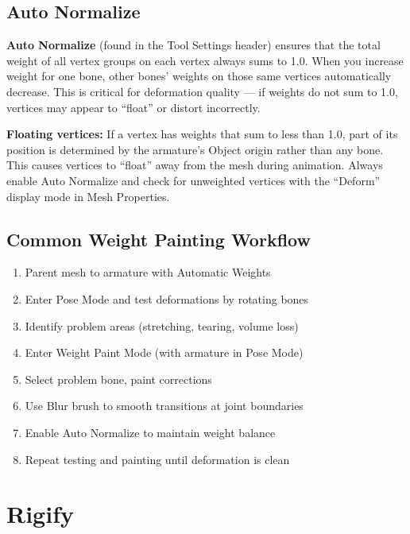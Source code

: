 \subsection{Auto Normalize}

\textbf{Auto Normalize} (found in the Tool Settings header) ensures that the total weight of all vertex groups on each vertex always sums to 1.0. When you increase weight for one bone, other bones' weights on those same vertices automatically decrease. This is critical for deformation quality --- if weights do not sum to 1.0, vertices may appear to ``float'' or distort incorrectly.

\begin{warningbox}
\textbf{Floating vertices:} If a vertex has weights that sum to less than 1.0, part of its position is determined by the armature's Object origin rather than any bone. This causes vertices to ``float'' away from the mesh during animation. Always enable Auto Normalize and check for unweighted vertices with the ``Deform'' display mode in Mesh Properties.
\end{warningbox}

\subsection{Common Weight Painting Workflow}

\begin{enumerate}[leftmargin=2em]
  \item Parent mesh to armature with Automatic Weights
  \item Enter Pose Mode and test deformations by rotating bones
  \item Identify problem areas (stretching, tearing, volume loss)
  \item Enter Weight Paint Mode (with armature in Pose Mode)
  \item Select problem bone, paint corrections
  \item Use Blur brush to smooth transitions at joint boundaries
  \item Enable Auto Normalize to maintain weight balance
  \item Repeat testing and painting until deformation is clean
\end{enumerate}


\section{Rigify}
\label{sec:rigify}

